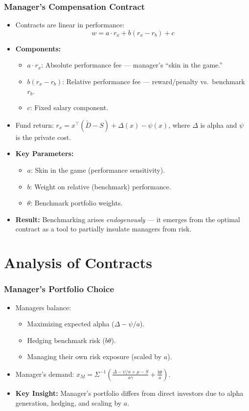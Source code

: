\documentclass{beamer} %
\begin{document}
	\begin{frame}
		\frametitle{Manager's Compensation Contract}
		\begin{itemize}
			\item Contracts are linear in performance:
			\[
			w = a \cdot r_x + b(r_x - r_b) + c
			\]
			\item \textbf{Components:}
			\begin{itemize}
				\item $a \cdot r_x$: Absolute performance fee — manager's ``skin in the game.''
				\item $b(r_x - r_b)$: Relative performance fee — reward/penalty vs.\ benchmark $r_b$.
				\item $c$: Fixed salary component.
			\end{itemize}
			\item Fund return: $r_x = x^{\top}(\tilde{D} - S) + \Delta(x) - \psi(x)$, where $\Delta$ is alpha and $\psi$ is the private cost.
			\item \textbf{Key Parameters:}
			\begin{itemize}
				\item $a$: Skin in the game (performance sensitivity).
				\item $b$: Weight on relative (benchmark) performance.
				\item $\theta$: Benchmark portfolio weights.
			\end{itemize}
			\item \textbf{Result:} Benchmarking arises \textit{endogenously} — it emerges from the optimal contract as a tool to partially insulate managers from risk.
		\end{itemize}
	\end{frame}
	
	\section{Analysis of Contracts}
	\begin{frame}
		\frametitle{Manager's Portfolio Choice}
		\begin{itemize}
			\item Managers balance:
			\begin{itemize}
				\item Maximizing expected alpha ($\Delta - \psi/a$).
				\item Hedging benchmark risk ($b\theta$).
				\item Managing their own risk exposure (scaled by $a$).
			\end{itemize}
			\item Manager's demand: $x_M = \Sigma^{-1} \left(\frac{\Delta - \psi/a + \mu - S}{a\gamma} + \frac{b\theta}{a}\right)$.
			\item \textbf{Key Insight:} Manager's portfolio differs from direct investors due to alpha generation, hedging, and scaling by $a$.
		\end{itemize}
	\end{frame}
	
\end{document}
